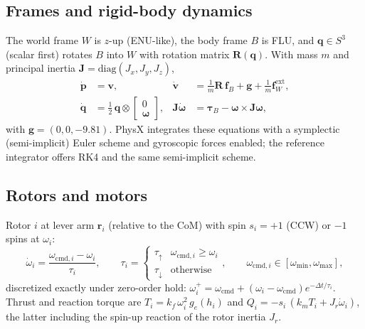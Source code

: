 \documentclass[11pt,a4paper]{article}
\newcommand{\vect}[1]{\bm{#1}}
\begin{document}
\subsection{Frames and rigid-body dynamics}
The world frame $W$ is $z$-up (ENU-like), the body frame $B$ is FLU, and $\vect q\in S^3$ (scalar first) rotates
$B$ into $W$ with rotation matrix $\vect R(\vect q)$. With mass $m$ and principal inertia
$\vect J=\mathrm{diag}(J_x,J_y,J_z)$,
\begin{align}
\dot{\vect p} &= \vect v, &
\dot{\vect v} &= \tfrac{1}{m}\vect R\,\vect f_B + \vect g + \tfrac{1}{m}\vect f^{\mathrm{ext}}_W,\\
\dot{\vect q} &= \tfrac12\,\vect q\otimes\begin{bmatrix}0\\ \bm\omega\end{bmatrix}, &
\vect J\dot{\bm\omega} &= \bm\tau_B - \bm\omega\times\vect J\bm\omega ,
\end{align}
with $\vect g=(0,0,-9.81)$. PhysX integrates these equations with a symplectic (semi-implicit) Euler scheme and
gyroscopic forces enabled; the reference integrator offers RK4 and the same semi-implicit scheme.

\subsection{Rotors and motors}
Rotor $i$ at lever arm $\vect r_i$ (relative to the CoM) with spin $s_i=+1$ (CCW) or $-1$ spins at $\omega_i$:
\begin{equation}
\dot\omega_i = \frac{\omega_{\mathrm{cmd},i}-\omega_i}{\tau_i},\qquad
\tau_i=\begin{cases}\tau_\uparrow & \omega_{\mathrm{cmd},i}\ge\omega_i\\ \tau_\downarrow & \text{otherwise}\end{cases},
\qquad \omega_{\mathrm{cmd},i}\in[\omega_{\min},\omega_{\max}],
\end{equation}
discretized exactly under zero-order hold: $\omega_i^{+}=\omega_{\mathrm{cmd}}+(\omega_i-\omega_{\mathrm{cmd}})e^{-\Delta t/\tau_i}$.
Thrust and reaction torque are $T_i=k_f\,\omega_i^2\,g_e(h_i)$ and
$Q_i=-s_i\,(k_m T_i + J_r\dot\omega_i)$, the latter including the spin-up reaction of the rotor inertia $J_r$.
\end{document}
